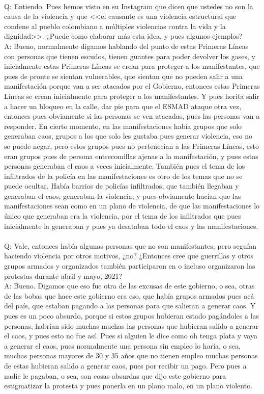 \documentclass{phyasgn}\usepackage{nag}
\begin{document}
\\
Q: Entiendo. Pues hemos visto en su Instagram que dicen que ustedes no son la causa de la violencia y que <<el causante es una violencia estructural que condene al pueblo colombiano a múltiples violencias contra la vida y la dignidad>>. ¿Puede como elaborar más esta idea, y pues algunos ejemplos?\\
A: Bueno, normalmente digamos hablando del punto de estas Primeras Líneas con personas que tienen escudos, tienen guantes para poder devolver los gases, y inicialmente estas Primeras Líneas se crean para proteger a los manifestantes, que pues de pronte se sientan vulnerables, que sientan que no pueden salir a una manifestación porque van a ser atacados por el Gobierno, entonces estas Primeras Líneas se crean inicialmente para proteger a los manifestantes. Y pues horita salir a hacer un bloqueo en la calle, dar pie para que el ESMAD ataque otra vez, entonces pues obviamente si las personas se ven atacadas, pues las personas van a responder. En cierto momento, en las manifestaciones había grupos que solo generaban caos, grupos a los que solo les gustaba pues generar violencia, eso no se puede negar, pero estos grupos pues no pertenecían a las Primeras Líneas, esto eran grupos pues de persona entrecomillas ajenas a la manifestación, y pues estas personas generaban el caos a veces inicialmente. También pues el tema de los infiltrados de la policía en las manifestaciones es otro de los temas que no se puede ocultar. Había barrios de policías infiltrados, que también llegaban y generaban el caos, generaban la violencia, y pues obviamente hacían que las manifestaciones sean como en un plano de violencia, de que las manifestaciones lo único que generaban era la violencia, por el tema de los infiltrados que pues inicialmente la generaban y pues ya desataban todo el caos y las manifestaciones.\\
\\
Q: Vale, entonces había algunas personas que no son manifestantes, pero seguían haciendo violencia por otros motivos, ¿no? ¿Entonces cree que guerrillas y otros grupos armados y organizados también participaron en o incluso organizaron las protestas durante abril y mayo, 2021?\\
A: Bueno. Digamos que eso fue otra de las excusas de este gobierno, o sea, otras de las bobas que hace este gobierno era eso, que había grupos armados pues acá del país, que estaban pagando a las personas para que salieran a generar caos. Y pues es un poco absurdo, porque si estos grupos hubieran estado pagándoles a las personas, habrían sido muchas muchas las personas que hubieran salido a generar el caos, y pues esto no fue así. Pues si alguien le dice como oh tenga plata y vaya a generar el caos, pues normalmente una persona sin empleo lo haría, o sea, muchas personas mayores de 30 y 35 años que no tienen empleo muchas personas de estas hubieran salido a generar caos, pues por recibir un pago. Pero pues a nadie le pagaban, o sea, son cosas absurdas que dijo este gobierno para estigmatizar la protesta y pues ponerla en un plano malo, en un plano violento. \\
\end{document}
